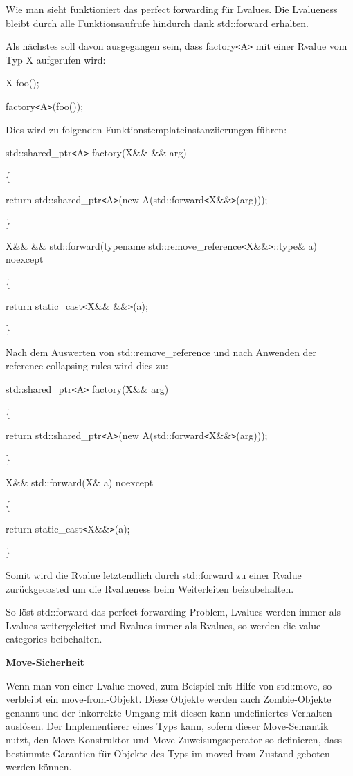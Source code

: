 \documentclass{article}
\begin{document}
Wie man sieht funktioniert das perfect forwarding für Lvalues. Die Lvalueness 
bleibt durch alle Funktionsaufrufe hindurch dank std::forward erhalten.

Als nächstes soll davon ausgegangen sein, dass factory\texttt{<}A\texttt{>} mit 
einer Rvalue vom Typ X aufgerufen wird:

X foo();

factory\texttt{<}A\texttt{>}(foo());

Dies wird zu folgenden Funktionstemplateinstanziierungen führen:

std::shared\_ptr\texttt{<}A\texttt{>} factory(X\&\& \&\& arg)

\{    

\parindent=14pt
return std::shared\_ptr\texttt{<}A\texttt{>}(new A(std::forward\texttt{<}X\&\&\texttt{>}(arg)));

\parindent=0pt
\}

X\&\& \&\& std::forward(typename std::remove\_reference\texttt{<}X\&\&\texttt{>}::type\& 
a) noexcept

\{    

\parindent=14pt
return static\_cast\texttt{<}X\&\& \&\&\texttt{>}(a);

\parindent=0pt
\}

Nach dem Auswerten von std::remove\_reference und nach Anwenden der reference collapsing 
rules wird dies zu:

std::shared\_ptr\texttt{<}A\texttt{>} factory(X\&\& arg)

\{    

\parindent=14pt
return std::shared\_ptr\texttt{<}A\texttt{>}(new A(std::forward\texttt{<}X\&\&\texttt{>}(arg)));

\parindent=0pt
\}

X\&\& std::forward(X\& a) noexcept

\{    

\parindent=14pt
return static\_cast\texttt{<}X\&\&\texttt{>}(a);

\parindent=0pt
\}

Somit wird die Rvalue letztendlich durch std::forward zu einer Rvalue zurückgecasted 
um die Rvalueness beim Weiterleiten beizubehalten.

So löst std::forward das perfect forwarding-Problem, Lvalues werden immer als 
Lvalues weitergeleitet und Rvalues immer als Rvalues, so werden die value categories 
beibehalten.

\textbf{Move-Sicherheit}

Wenn man von einer Lvalue moved, zum Beispiel mit Hilfe von std::move, so verbleibt 
ein move-from-Objekt. Diese Objekte werden auch Zombie-Objekte genannt und der 
inkorrekte Umgang mit diesen kann undefiniertes Verhalten auslösen. Der Implementierer 
eines Typs kann, sofern dieser Move-Semantik nutzt, den Move-Konstruktor und Move-Zuweisungsoperator 
so definieren, dass bestimmte Garantien für Objekte des Typs im moved-from-Zustand 
geboten werden können.
\end{document}
